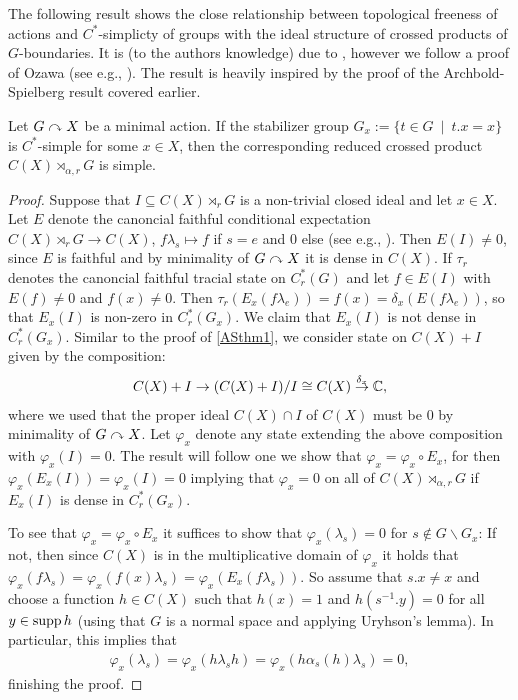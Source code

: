 The following result shows the close relationship between topological freeness of actions and $C^*$-simplicty of groups with the ideal structure of crossed products of $G$-boundaries. It is (to the authors knowledge) due to \cite{breuillard2017c}, however we follow a proof of Ozawa (see e.g., \cite{ozawa2014lecture}). The result is heavily inspired by the proof of the Archbold-Spielberg result covered earlier.
\begin{proposition}
	Let $G \stackrel{}{\curvearrowright} X$ be a minimal action. If the stabilizer group $G_x := \{ t \in G \ \mid \ t.x =x\}$ is $C^*$-simple for some $x \in X$, then the corresponding reduced crossed product $C(X) \rtimes_{\alpha,r} G$ is simple.
\end{proposition}
\begin{proof}
	Suppose that $I \subseteq C(X) \rtimes_r G$ is a non-trivial closed ideal and let $x \in X$. Let $E$ denote the canoncial faithful conditional expectation $C(X) \rtimes_r G \to C(X)$, $f \lambda_s \mapsto f$ if $s  = e$ and $0$ else (see e.g., \cite[proposition 4.1.9]{brown2008c}). Then $E(I) \neq 0$, since $E$ is faithful and by minimality of $G \stackrel{}{\curvearrowright} X$ it is dense in $C(X)$. If $\tau_r$ denotes the canoncial faithful tracial state on $C_r^*(G)$ and let $f \in E(I)$ with $E(f) \neq 0$ and $f(x) \neq 0$. Then $\tau_r (E_x(f \lambda_e))= f(x) = \delta_x(E(f\lambda_e))$, so that $E_x(I)$ is non-zero in $C_r^*(G_x)$. We claim that $E_x(I)$ is not dense in $C_r^*(G_x)$. Similar to the proof of \cref{ASthm1}, we consider state on $C(X) + I$ given by the composition:
	\begin{align*}
		C(X) + I \to (C(X)+I)/I \cong C(X) \stackrel {\delta_x} \to \mathbb{C},
	\end{align*}
	where we used that the proper ideal $C(X) \cap I$ of $C(X)$ must be $0$ by minimality of $G \stackrel{}{\curvearrowright} X$. Let $\varphi_x$ denote any state extending the above composition with $\varphi_x(I) =0$. The result will follow one we show that $\varphi_x = \varphi_x \circ E_x$, for then $\varphi_x (E_x(I)) = \varphi_x(I) = 0 $ implying that $\varphi_x= 0$ on all of $C(X) \rtimes_{\alpha,r}G$ if $E_x(I)$ is dense in $C_r^*(G_x)$. 

	To see that $\varphi_x = \varphi_x \circ E_x$ it suffices to show that $\varphi_x (\lambda_s) = 0$ for $s \not \in G \backslash G_x$: If not, then since $C(X)$ is in the multiplicative domain of $\varphi_x$ it holds that $\varphi_x(f \lambda_s) =  \varphi_x( f(x) \lambda_s)  =  \varphi_x (E_x( f\lambda_s))$. So assume that $s.x \neq x$ and choose a function $h \in C(X)$ such that $h(x) = 1$ and $h(s^{-1}.y) = 0$ for all $y \in \operatorname{supp} h$ (using that $G$ is a normal space and applying Uryhson's lemma). In particular, this implies that 
	\begin{align*}
		\varphi_x(\lambda_s) = \varphi_x(h\lambda_sh) = \varphi_x(h \alpha_s(h)\lambda_s)   = 0,
	\end{align*}
	finishing the proof.
\end{proof}
